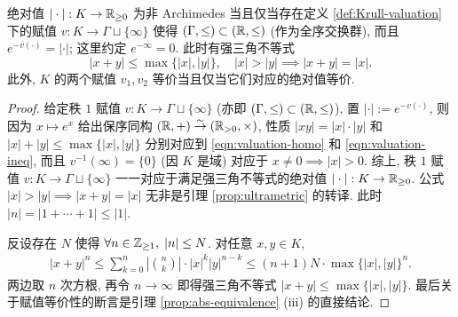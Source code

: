 \begin{proposition}\label{prop:abs-valuation}
	绝对值 $|\cdot|: K \to \mathbb{R}_{\geq 0}$ 为非 Archimedes 当且仅当存在定义 \ref{def:Krull-valuation} 下的赋值 $v: K \to \Gamma \sqcup \{\infty\}$ 使得 $(\Gamma, \leq) \subset (\mathbb{R}, \leq)$ (作为全序交换群), 而且 $e^{-v(\cdot)} = |\cdot|$; 这里约定 $e^{-\infty}=0$. 此时有强三角不等式
	\[ |x+y| \leq \max\{ |x|, |y| \}, \quad |x|>|y| \implies |x+y|=|x|. \]
	此外, $K$ 的两个赋值 $v_1, v_2$ 等价当且仅当它们对应的绝对值等价.
\end{proposition}
\begin{proof}
	给定秩 $1$ 赋值 $v: K \to \Gamma \sqcup\{\infty\}$ (亦即 $(\Gamma, \leq) \subset (\mathbb{R}, \leq)$), 置 $|\cdot| := e^{-v(\cdot)}$, 则因为 $x \mapsto e^x$ 给出保序同构 $(\mathbb{R}, +) \stackrel{\sim}{\rightarrow} (\mathbb{R}_{>0}, \times)$, 性质 $|xy|=|x| \cdot |y|$ 和 $|x|+|y| \leq \max\{|x|,|y|\}$ 分别对应到 \eqref{eqn:valuation-homo} 和 \eqref{eqn:valuation-ineq}, 而且 $v^{-1}(\infty)=\{0\}$ (因 $K$ 是域) 对应于 $x \neq 0 \implies |x| > 0$. 综上, 秩 $1$ 赋值 $v: K \to \Gamma \sqcup \{\infty\}$ 一一对应于满足强三角不等式的绝对值 $|\cdot|: K \to \mathbb{R}_{\geq 0}$. 公式 $|x|>|y| \implies |x+y|=|x|$ 无非是引理 \ref{prop:ultrametric} 的转译. 此时 $|n| = |1+ \cdots + 1| \leq |1|$.
	
	反设存在 $N$ 使得 $\forall n \in \mathbb{Z}_{\geq 1}, \; |n| \leq N$. 对任意 $x,y \in K$,
	\begin{gather*}
		|x+y|^n \leq \sum_{k=0}^n \left| \binom{n}{k}  \right| \cdot |x|^k |y|^{n-k} \leq (n+1)N \cdot \max\{|x|,|y|\}^n.
	\end{gather*}
	两边取 $n$ 次方根, 再令 $n \to \infty$ 即得强三角不等式 $|x+y| \leq \max\{|x|,|y|\}$. 最后关于赋值等价性的断言是引理 \ref{prop:abs-equivalence} (iii) 的直接结论.
\end{proof}

